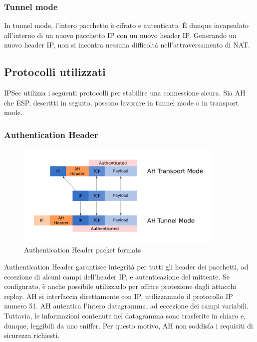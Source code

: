 \subsubsection{Tunnel mode}
In tunnel mode, l'intero pacchetto è cifrato e autenticato. È dunque incapsulato all'interno di un nuovo pacchetto IP con un nuovo header IP.
Generando un nuovo header IP, non si incontra nessuna difficoltà nell'attraversamento di NAT.


\subsection{Protocolli utilizzati}
IPSec utilizza i seguenti protocolli per stabilire una connessione sicura. Sia AH che ESP, descritti in seguito, possono lavorare in tunnel mode o in transport mode.

\subsubsection{Authentication Header}
\begin{figure}[ht]
    \centering
    \includegraphics[width=10cm]{figure/ah_tun_trasp.png}
    \caption{Authentication Header packet formats}
\end{figure}

Authentication Header \cite[RFC4302]{RFC4302} garantisce integrità per tutti gli header dei pacchetti, ad eccezione di alcuni campi dell'header IP, e autenticazione del mittente. Se configurato, è anche possibile utilizzarlo per offrire protezione dagli attacchi replay. AH si interfaccia direttamente con IP, utilizzamndo il protocollo IP numero 51.
AH autentica l'intero datagramma, ad eccezione dei campi variabili. Tuttavia, le informazioni contenute nel datagramma sono trasferite in chiaro e, dunque, leggibili da uno sniffer. Per questo motivo, AH non soddisfa i requisiti di sicurezza richiesti.

